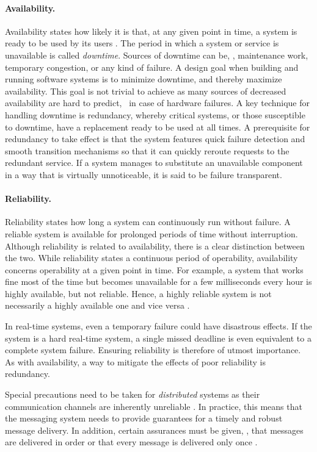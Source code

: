 \paragraph{Availability.}
Availability states how likely it is that, at any given point in time, a system is ready to be used by its users \cite{tanenbaum2017distributed}. The period in which a system or service is unavailable is called \emph{downtime}. Sources of downtime can be, \eg , maintenance work, temporary congestion, or any kind of failure. A design goal when building and running software systems is to minimize downtime, and thereby maximize availability. This goal is not trivial to achieve as many sources of decreased availability are hard to predict, \eg\ in case of hardware failures. A key technique for handling downtime is redundancy, whereby critical systems, or those susceptible to downtime, have a replacement ready to be used at all times. A prerequisite for redundancy to take effect is that the system features quick failure detection and smooth transition mechanisms so that it can quickly reroute requests to the redundant service. If a system manages to substitute an unavailable component in a way that is virtually unnoticeable, it is said to be failure transparent.

\paragraph{Reliability.}
Reliability states how long a system can continuously run without failure. A reliable system is available for prolonged periods of time without interruption. Although reliability is related to availability, there is a clear distinction between the two. While reliability states a continuous period of operability, availability concerns operability at a given point in time. For example, a system that works fine most of the time but becomes unavailable for a few milliseconds every hour is highly available, but not reliable. Hence, a highly reliable system is not necessarily a highly available one and vice versa \cite{tanenbaum2017distributed}.

In real-time systems, even a temporary failure could have disastrous effects. If the system is a hard real-time system, a single missed deadline is even equivalent to a complete system failure. Ensuring reliability is therefore of utmost importance. As with availability, a way to mitigate the effects of poor reliability is redundancy.

Special precautions need to be taken for \emph{distributed} systems as their communication channels are inherently unreliable \cite{tanenbaum2017distributed}. In practice, this means that the messaging system needs to provide guarantees for a timely and robust message delivery. In addition, certain assurances must be given, \eg , that messages are delivered in order or that every message is delivered only once \cite{o2007quality}. 

